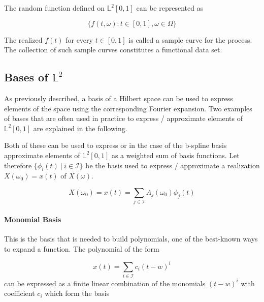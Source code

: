 \documentclass[11pt,twoside,a4paper]{article}
\begin{document}
	
	The random function defined on $\mathbb{L}^2[0,1]$ can be represented as
	
	\begin{equation}
	\{f(t,\omega) : t \in [0, 1], \omega \in \Omega\}
	\end{equation}
	
	The realized $f(t)$ for every $t \in [0,1]$ is called a sample curve for the process. The collection of such sample curves constitutes a functional data set.
	
	\subsection{Bases of $\mathbb{L}^2$} %
	As previously described, a basis of a Hilbert space can be used to express elements of the space using the corresponding Fourier expansion. Two examples of bases that are often used in practice to express / approximate elements of $\mathbb{L}^2[0,1]$  are explained in the following.
	
	Both of these can be used to express or in the case of the b-spline basis approximate elements of $\mathbb{L}^2[0,1]$ as a weighted sum of basis functions. Let therefore $\{\phi_i(t) \: \vert \: i \in \mathcal{I}\}$ be the basis used to express / approximate a realization $X(\omega_0) = x(t)$ of $X(\omega)$.
	
	\begin{equation}
		X(\omega_0) = x(t) = \sum_{j \in \mathcal{I}} A_{j}(\omega_0) \phi_j(t)
	\end{equation}
	
	\paragraph{Monomial Basis}
This is the basis that is needed to build polynomials, one of the best-known ways to expand a function.
The polynomial of the form 

	\begin{equation}
		x(t) = \sum_{i \in \mathcal{I}} c_i(t -w)^{i}
	\end{equation}
	can be expressed as a finite linear combination of the monomials $(t - w)^{i}$ with coefficient $c_i$ which form the basis 
	
\end{document}
